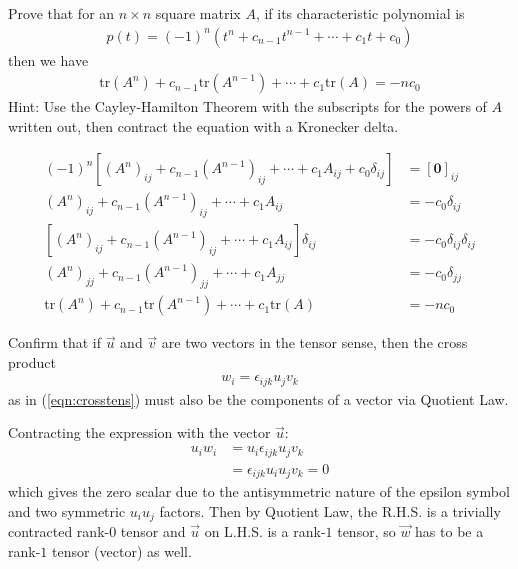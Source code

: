 \begin{Exercise}
Prove that for an $n \times n$ square matrix $A$, if its characteristic polynomial is
\begin{align*}
p(t) = (-1)^n(t^n + c_{n-1}t^{n-1} + \cdots + c_1 t + c_0)
\end{align*}
then we have
\begin{align*}
\text{tr}(A^n) + c_{n-1}\text{tr}(A^{n-1}) + \cdots + c_1 \text{tr}(A) = -nc_0
\end{align*}
Hint: Use the Cayley-Hamilton Theorem with the subscripts for the powers of $A$ written out, then contract the equation with a Kronecker delta.
\end{Exercise}
\begin{Answer}
\begin{align*}
(-1)^n[(A^n)_{ij} + c_{n-1}(A^{n-1})_{ij} + \cdots + c_1 A_{ij} + c_0\delta_{ij}] &= [\textbf{0}]_{ij} \\ 
(A^n)_{ij} + c_{n-1}(A^{n-1})_{ij} + \cdots + c_1 A_{ij} &= -c_0\delta_{ij} \\
[(A^n)_{ij} + c_{n-1}(A^{n-1})_{ij} + \cdots + c_1 A_{ij}]\delta_{ij} &= -c_0\delta_{ij}\delta_{ij} \\
(A^n)_{jj} + c_{n-1}(A^{n-1})_{jj} + \cdots + c_1 A_{jj} &= -c_0\delta_{jj} \\
\text{tr}(A^n) + c_{n-1}\text{tr}(A^{n-1}) + \cdots + c_1 \text{tr}(A) &= -nc_0
\end{align*}
\end{Answer}

\begin{Exercise}
Confirm that if $\vec{u}$ and $\vec{v}$ are two vectors in the tensor sense, then the cross product
\begin{align*}
w_i = \epsilon_{ijk}u_jv_k
\end{align*}
as in (\ref{eqn:crosstens}) must also be the components of a vector via Quotient Law.
\end{Exercise}
\begin{Answer}
Contracting the expression with the vector $\vec{u}$:
\begin{align*}
u_iw_i &= u_i\epsilon_{ijk}u_jv_k \\
&= \epsilon_{ijk}u_iu_jv_k = 0
\end{align*}
which gives the zero scalar due to the antisymmetric nature of the epsilon symbol and two symmetric $u_iu_j$ factors. Then by Quotient Law, the R.H.S. is a trivially contracted rank-$0$ tensor and $\vec{u}$ on L.H.S. is a rank-$1$ tensor, so $\vec{w}$ has to be a rank-$1$ tensor (vector) as well.
\end{Answer}

